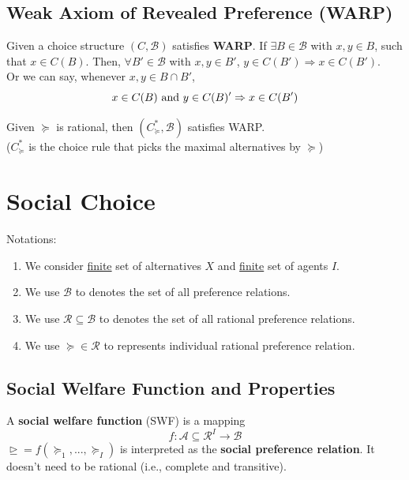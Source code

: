 \documentclass[11pt]{elegantbook}
\begin{document}
\subsection{Weak Axiom of Revealed Preference (WARP)}
\begin{definition}
    \normalfont
    Given a choice structure $(C,\mathcal{B})$ satisfies \textbf{WARP}. If $\exists B\in \mathcal{B}$ with $x,y\in B$, such that $x\in C(B)$. Then, $\forall B'\in \mathcal{B}$ with $x,y\in B'$, $y\in C(B') \Rightarrow x\in C(B')$.\\
    Or we can say, whenever $x,y\in B\cap B'$, $$x\in C(B) \textnormal{ and }y\in C(B)' \Rightarrow x\in C(B')$$
\end{definition}

\begin{proposition}
    Given $\succeq$ is rational, then $(C^*_{\succeq},\mathcal{B})$ satisfies WARP.\\
    ($C^*_{\succeq}$ is the choice rule that picks the maximal alternatives by $\succeq$)
\end{proposition}




\section{Social Choice}
Notations:
\begin{enumerate}
    \item We consider \underline{finite} set of alternatives $X$ and \underline{finite} set of agents $I$.
    \item We use $\mathcal{B}$ to denotes the set of all preference relations.
    \item We use $\mathcal{R}\subseteq \mathcal{B}$ to denotes the set of all rational preference relations.
    \item We use $\succeq\in \mathcal{R}$ to represents individual rational preference relation.
\end{enumerate}

\subsection{Social Welfare Function and Properties}
\begin{definition}
    \normalfont
    A \textbf{social welfare function} (SWF) is a mapping $$f: \mathcal{A}\subseteq \mathcal{R}^I\rightarrow \mathcal{B}$$
    $\trianglerighteq=f(\succeq_1,...,\succeq_I)$ is interpreted as the \textbf{social preference relation}. It doesn't need to be rational (i.e., complete and transitive).
\end{definition}
\end{document}
